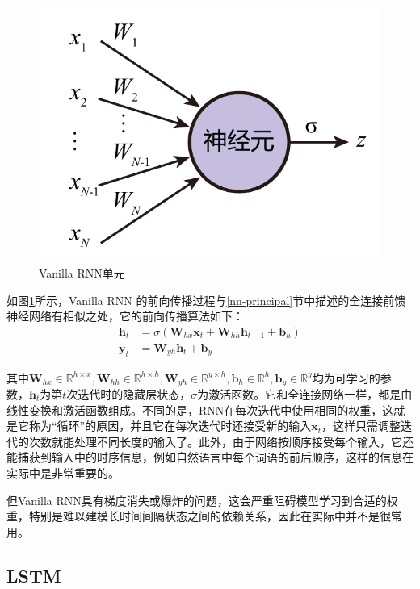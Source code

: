 \begin{figure}[]
    \centering
    \includegraphics[page=3]{figure/figures.pdf}
    \caption{Vanilla RNN单元}
    \label{vanilla-rnn}
\end{figure}

如图\ref{vanilla-rnn}所示，Vanilla RNN 的前向传播过程与\ref{nn-principal}节中描述的全连接前馈神经网络有相似之处，它的前向传播算法如下：
\begin{align}
    \bm{h}_t&=\sigma\left(\bm{W}_{hx}\bm{x}_t+\bm{W}_{hh}\bm{h}_{t-1}+\bm{b}_h\right)\\
    \bm{y}_t&=\bm{W}_{yh}\bm{h}_t+\bm{b}_y
\end{align}

其中$\bm{W}_{hx}\in\mathbb{R}^{h\times x},\bm{W}_{hh}\in\mathbb{R}^{h\times h},\bm{W}_{yh}\in\mathbb{R}^{y\times h},\bm{b}_h\in\mathbb{R}^h,\bm{b}_y\in\mathbb{R}^y$均为可学习的参数，$\bm{h}_t$为第$t$次迭代时的隐藏层状态，$\sigma$为激活函数。它和全连接网络一样，都是由线性变换和激活函数组成。不同的是，RNN在每次迭代中使用相同的权重，这就是它称为“循环”的原因，并且它在每次迭代时还接受新的输入$\bm{x}_t$，这样只需调整迭代的次数就能处理不同长度的输入了。此外，由于网络按顺序接受每个输入，它还能捕获到输入中的时序信息，例如自然语言中每个词语的前后顺序，这样的信息在实际中是非常重要的。

但Vanilla RNN具有梯度消失或爆炸的问题，这会严重阻碍模型学习到合适的权重，特别是难以建模长时间间隔状态之间的依赖关系，因此在实际中并不是很常用。

\subsection{LSTM}

